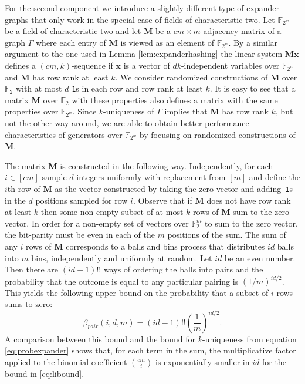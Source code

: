 \documentclass[a4paper,11pt]{article}
\theoremstyle{plain}
\theoremstyle{definition}
\newcommand{\F}{\mathbb{F}}
\newcommand{\mat}[1]{\mathbf{#1}}
\newcommand{\vect}[1]{\boldsymbol{#1}}
\begin{document}
For the second component we introduce a slightly different type of expander graphs that only work in the special case of
fields of characteristic two. 
Let $\F_{2^{w}}$ be a field of characteristic two and let $\mat{M}$ be a $cm \times m$ adjacency matrix of a graph $\Gamma$ where each entry of $\mat{M}$ is viewed as an element of $\F_{2^{w}}$.    
By a similar argument to the one used in Lemma \ref{lem:expanderhashing} the linear system $\mat{M}\vect{x}$ defines a $(cm, k)$-sequence if $\vect{x}$ is a vector of \mbox{$dk$-independent} variables over $\F_{2^{w}}$ and $\mat{M}$ has row rank at least $k$.
We consider randomized constructions of $\mat{M}$ over $\F_{2}$ with at most $d$ \texttt{1}s in each row and row rank at least $k$.
It is easy to see that a matrix $\mat{M}$ over $\F_{2}$ with these properties also defines a matrix with the same properties over $\F_{2^{w}}$.
Since $k$-uniqueness of $\Gamma$ implies that $\mat{M}$ has row rank $k$, but not the other way around, 
we are able to obtain better performance characteristics of generators over $\F_ {2^{w}}$ by focusing on randomized constructions of $\mat{M}$.

The matrix $\mat{M}$ is constructed in the following way.
Independently, for each $i \in [cm]$ sample $d$ integers uniformly with replacement from $[m]$ and define the $i$th row of $\mat{M}$ as the vector constructed by taking the zero vector and adding~\texttt{1}s in the $d$ positions sampled for row $i$.
Observe that if $\mat{M}$ does not have row rank at least $k$ then some non-empty subset of at most $k$ rows of $\mat{M}$ sum to the zero vector.
In order for a non-empty set of vectors over $\F_{2}^{m}$ to sum to the zero vector, the bit-parity must be even in each of the $m$ positions of the sum. 
The sum of any $i$ rows of $\mat{M}$ corresponds to a balls and bins process that distributes $id$ balls into $m$ bins, independently and uniformly at random.
Let $id$ be an even number. Then there are $(id - 1)!!$ ways of ordering the balls into pairs and the probability that the outcome is equal to any particular pairing is $(1/m)^{id/2}$. 
This yields the following upper bound on the probability that a subset of $i$ rows sums to zero: 
\begin{equation}
\beta_{pair}(i, d, m) = (id-1)!!\! \left(\frac{1}{m}\right)^{id/2}. \label{eq:libound} 
\end{equation}
A comparison between this bound and the bound for $k$-uniqueness from equation \eqref{eq:probexpander} shows that, for each term in the sum, 
the multiplicative factor applied to the binomial coefficient $\binom{cm}{i}$ is exponentially smaller in $id$ for the bound in \eqref{eq:libound}.
\end{document}
